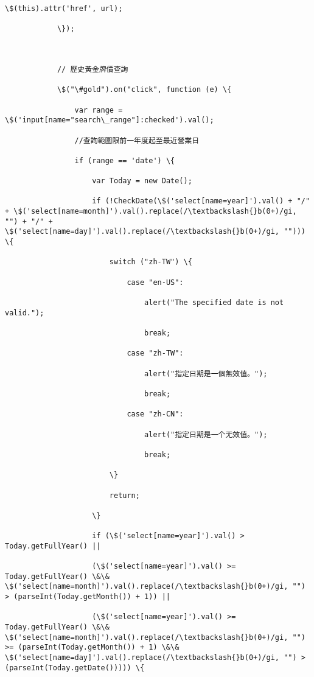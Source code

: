 \documentclass[11pt]{article}
\begin{document}
\begin{Verbatim}[commandchars=\\\{\}]
                \$(this).attr('href', url);

            \});



            // 歷史黃金牌價查詢

            \$("\#gold").on("click", function (e) \{

                var range = \$('input[name="search\_range"]:checked').val();

                //查詢範圍限前一年度起至最近營業日

                if (range == 'date') \{

                    var Today = new Date();

                    if (!CheckDate(\$('select[name=year]').val() + "/" + \$('select[name=month]').val().replace(/\textbackslash{}b(0+)/gi, "") + "/" + \$('select[name=day]').val().replace(/\textbackslash{}b(0+)/gi, ""))) \{

                        switch ("zh-TW") \{

                            case "en-US":

                                alert("The specified date is not valid.");

                                break;

                            case "zh-TW":

                                alert("指定日期是一個無效值。");

                                break;

                            case "zh-CN":

                                alert("指定日期是一个无效值。");

                                break;

                        \}

                        return;

                    \}

                    if (\$('select[name=year]').val() > Today.getFullYear() ||

                    (\$('select[name=year]').val() >= Today.getFullYear() \&\& \$('select[name=month]').val().replace(/\textbackslash{}b(0+)/gi, "") > (parseInt(Today.getMonth()) + 1)) ||

                    (\$('select[name=year]').val() >= Today.getFullYear() \&\& \$('select[name=month]').val().replace(/\textbackslash{}b(0+)/gi, "") >= (parseInt(Today.getMonth()) + 1) \&\& \$('select[name=day]').val().replace(/\textbackslash{}b(0+)/gi, "") > (parseInt(Today.getDate())))) \{


\end{Verbatim}
\end{document}
